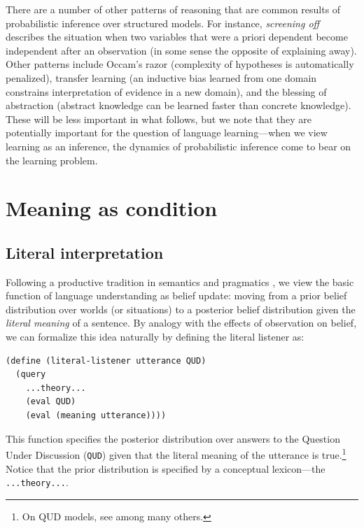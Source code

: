 \documentclass[12pt]{article}
\begin{document}
There are a number of other patterns of reasoning that are common results of probabilistic inference over structured models. 
For instance, \emph{screening off} describes the situation when two variables that were a priori dependent become independent after an observation (in some sense the opposite of explaining away).
Other patterns include Occam's razor (complexity of hypotheses is automatically penalized), transfer learning (an inductive bias learned from one domain constrains interpretation of evidence in a new domain), and the blessing of abstraction (abstract knowledge can be learned faster than concrete knowledge). 
These will be less important in what follows, but we note that they are potentially important for the question of language learning---when we view learning as an inference, the dynamics of probabilistic inference come to bear on the learning problem. 

 
\section{Meaning as condition}


\subsection{\label{literal-listener}Literal interpretation}

Following a productive tradition in semantics and pragmatics \citep[][etc.]{stalnaker78,lewis79,heim82}, we view the basic function of language understanding as belief update: moving from a prior belief distribution over worlds (or situations) to a posterior belief distribution given the \emph{literal meaning} of a sentence. 
By analogy with the effects of observation on belief, we can formalize this idea naturally by defining the literal listener as:
\begin{lstlisting}
(define (literal-listener utterance QUD)
  (query
    ...theory...
    (eval QUD)
    (eval (meaning utterance))))
\end{lstlisting}
This function specifies the posterior distribution over answers to the Question Under Discussion (\lstinline{QUD}) given that the literal meaning of the utterance is true.\footnote{On QUD models, see \citealt{ginzburg95a,vankuppevelt95,roberts96,beaverclark08} among many others.}  Notice that the prior distribution is specified by a conceptual lexicon---the \lstinline{...theory...}. 
\end{document}
